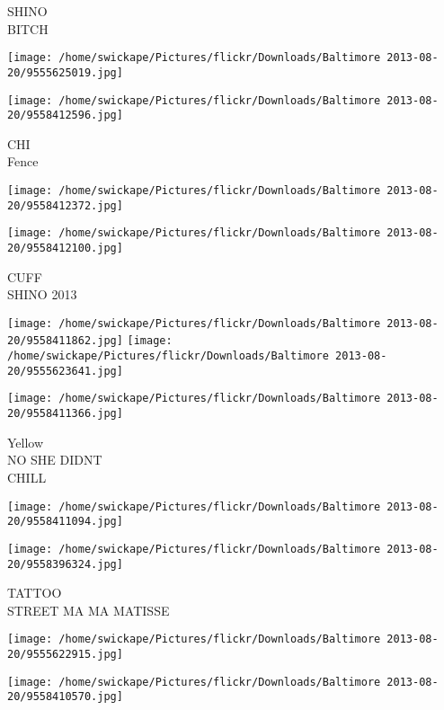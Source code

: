 \documentclass[10pt,letterpaper]{article}
\begin{document}
SHINO\\
BITCH\\
\pagebreak

\texttt{[image: /home/swickape/Pictures/flickr/Downloads/Baltimore 2013-08-20/9555625019.jpg]}

\vspace{0.25in}
\texttt{[image: /home/swickape/Pictures/flickr/Downloads/Baltimore 2013-08-20/9558412596.jpg]}

CHI\\
Fence\\
\pagebreak

\texttt{[image: /home/swickape/Pictures/flickr/Downloads/Baltimore 2013-08-20/9558412372.jpg]}

\vspace{0.25in}
\texttt{[image: /home/swickape/Pictures/flickr/Downloads/Baltimore 2013-08-20/9558412100.jpg]}

CUFF\\
SHINO 2013\\
\pagebreak

\texttt{[image: /home/swickape/Pictures/flickr/Downloads/Baltimore 2013-08-20/9558411862.jpg]}
\texttt{[image: /home/swickape/Pictures/flickr/Downloads/Baltimore 2013-08-20/9555623641.jpg]}

\vspace{0.25in}
\texttt{[image: /home/swickape/Pictures/flickr/Downloads/Baltimore 2013-08-20/9558411366.jpg]}

Yellow\\
NO SHE DIDNT\\
CHILL\\
\pagebreak

\texttt{[image: /home/swickape/Pictures/flickr/Downloads/Baltimore 2013-08-20/9558411094.jpg]}

\vspace{0.25in}
\texttt{[image: /home/swickape/Pictures/flickr/Downloads/Baltimore 2013-08-20/9558396324.jpg]}

TATTOO\\
STREET MA MA MATISSE\\
\pagebreak

\texttt{[image: /home/swickape/Pictures/flickr/Downloads/Baltimore 2013-08-20/9555622915.jpg]}

\vspace{0.25in}
\texttt{[image: /home/swickape/Pictures/flickr/Downloads/Baltimore 2013-08-20/9558410570.jpg]}
\end{document}
